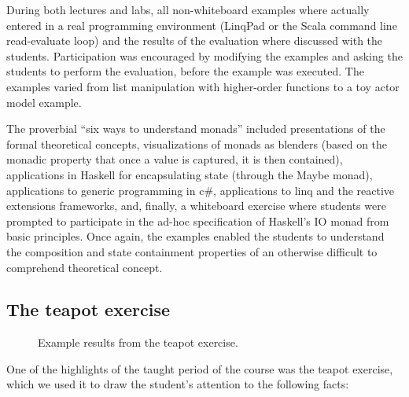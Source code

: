 \documentclass[conference]{IEEEtran}
\begin{document}
During both lectures and labs, all non-whiteboard examples where actually
entered in a real programming environment (LinqPad or the Scala command line
read-evaluate loop) and the results of the evaluation where discussed with the
students. Participation was encouraged by modifying the examples and asking the
students to perform the evaluation, before the example was executed. The
examples varied from list manipulation with higher-order functions to 
a toy actor model example.

The proverbial ``six ways to understand monads'' included presentations of the
formal theoretical concepts, visualizations of monads as blenders (based on the
monadic property that once a value is captured, it is then contained),
applications in Haskell for encapsulating state (through the \textsf{Maybe}
monad), applications to generic programming in {\sc c\#}, applications to {\sc
linq} and the reactive extensions frameworks, and, finally, a whiteboard
exercise where students were prompted to participate in the ad-hoc specification
of Haskell's \textsf{IO} monad from basic principles. Once again, the examples
enabled the students to understand the composition and state containment
properties of an otherwise difficult to comprehend theoretical concept.

\subsection{The teapot exercise}

\begin{figure*}
\centering
\label{fig:teapots}
\caption[]{Example results from the teapot exercise.}

\vspace{-1.5em}
\end{figure*}

One of the highlights of the taught period of the course was the teapot
exercise, which we used it to draw the student's attention to the following
facts:
\end{document}
